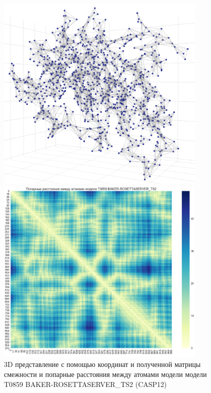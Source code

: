 \documentclass[12pt,twosides]{article}
\begin{document}
	\begin{figure}[H]
		\centering
		\begin{minipage}[b]{0.49\textwidth}
			\centering
			\includegraphics[width=0.9\textwidth]{3d_graph.pdf}
		\end{minipage}
		\begin{minipage}[b]{0.49\textwidth}
			\centering
			\includegraphics[width=0.9\textwidth]{pairwise.pdf}
		\end{minipage}
	\caption{3D представление с помощью координат и полученной матрицы смежности и попарные расстояния между атомами модели модели T0859 BAKER-ROSETTASERVER\_TS2 (CASP12)}
	\label{protein_vis}
	\end{figure}
\end{document}
